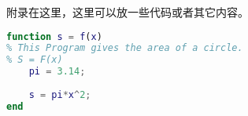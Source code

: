 \begin{appendix}
附录在这里，这里可以放一些代码或者其它内容。
\begin{lstlisting}[caption=代码抄录示例,language=Matlab,label=code:exm2]
function s = f(x)
% This Program gives the area of a circle.
% S = F(x)
    pi = 3.14;
    
    s = pi*x^2;
end
\end{lstlisting}

\end{appendix}